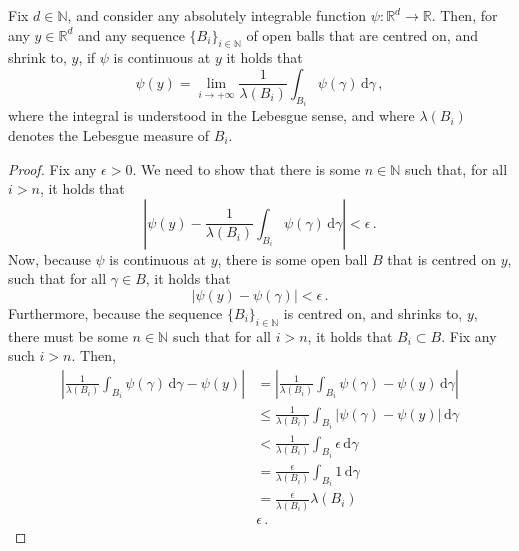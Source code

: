 \documentclass[twoside,11pt]{article}
\newcommand{\nats}{\mathbb{N}}
\newcommand{\reals}{\mathbb{R}}
\newcommand{\abs}[1]{\left\vert #1 \right\vert}
\begin{document}
\begin{lemma}\label{lemma:lebesgue_differentiation_theorem}
Fix $d\in\nats$, and consider any absolutely integrable function $\psi:\reals^d\to \reals$. Then, for any $y\in\reals^d$ and any sequence $\{B_i\}_{i\in\nats}$ of open balls that are centred on, and shrink to, $y$, if $\psi$ is continuous at $y$ it holds that
\begin{equation*}
\psi(y) = \lim_{i\to+\infty} \frac{1}{\lambda(B_i)}\int_{B_i}\psi(\gamma)\,\mathrm{d}\gamma\,,
\end{equation*}
where the integral is understood in the Lebesgue sense, and where $\lambda(B_i)$ denotes the Lebesgue measure of $B_i$.
\end{lemma}
\begin{proof}
Fix any $\epsilon>0$. We need to show that there is some $n\in\nats$ such that, for all $i>n$, it holds that
\begin{equation*}
\abs{\psi(y) - \frac{1}{\lambda(B_i)}\int_{B_i}\psi(\gamma)\,\mathrm{d}\gamma} < \epsilon\,.
\end{equation*}
Now, because $\psi$ is continuous at $y$, there is some open ball $B$ that is centred on $y$, such that for all $\gamma\in B$, it holds that
\begin{equation*}
\abs{\psi(y)-\psi(\gamma)} < \epsilon\,.
\end{equation*}
Furthermore, because the sequence $\{B_i\}_{i\in\nats}$ is centred on, and shrinks to, $y$, there must be some $n\in\nats$ such that for all $i>n$, it holds that $B_i\subset B$. Fix any such $i>n$. Then,
\begin{align*}
\abs{\frac{1}{\lambda(B_i)}\int_{B_i}\psi(\gamma)\,\mathrm{d}\gamma - \psi(y)} &= \abs{\frac{1}{\lambda(B_i)}\int_{B_i}\psi(\gamma) - \psi(y)\,\mathrm{d}\gamma} \\
 &\leq \frac{1}{\lambda(B_i)}\int_{B_i}\abs{\psi(\gamma) - \psi(y)}\,\mathrm{d}\gamma \\
 &< \frac{1}{\lambda(B_i)}\int_{B_i}\epsilon\,\mathrm{d}\gamma \\
 &= \frac{\epsilon}{\lambda(B_i)}\int_{B_i}1\,\mathrm{d}\gamma \\
 &= \frac{\epsilon}{\lambda(B_i)}\lambda(B_i) \\
 & \epsilon\,.
\end{align*}
\end{proof}
\end{document}
